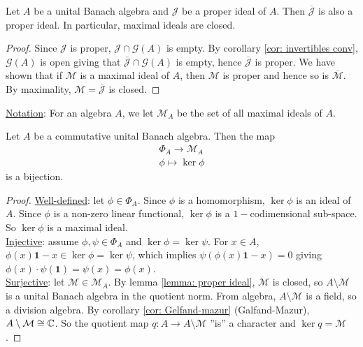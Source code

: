 \documentclass{article}
\begin{document}
\begin{boxlemma}\label{lemma: proper ideal}
    Let $A$ be a unital Banach algebra and $\mathcal{J}$ be a proper ideal of $A$. Then $\overline{\mathcal{J}}$ is also a proper ideal. In particular, maximal ideals are closed.
\end{boxlemma}

\begin{proof}
    Since $\mathcal{J}$ is proper, $\mathcal{J}\cap \mathcal{G}(A)$ is empty. By corollary \ref{cor: invertibles conv}, $\mathcal{G}(A)$ is open giving that $\overline{\mathcal{J}}\cap \mathcal{G}(A)$ is empty, hence $\overline{\mathcal{J}}$ is proper. We have shown that if $\mathcal{M}$ is a maximal ideal of $A$, then $\mathcal{M}$ is proper and hence so is $\overline{\mathcal{M}}$. By maximality, $\mathcal{M} = \overline{\mathcal{J}}$ is closed.
\end{proof}

\noindent\underline{Notation}: For an algebra $A$, we let $\mathcal{M}_A$ be the set of all maximal ideals of $A$.

\begin{theorem}\label{thm: maximal ideal bijection}
    Let $A$ be a commutative unital Banach algebra. Then the map 
    $$
    \begin{array}{cc}
        \Phi_A \to \mathcal{M}_A\\
        \phi \mapsto \ker\phi
    \end{array}
    $$
    is a bijection.
\end{theorem}

\begin{proof}
    \noindent\underline{Well-defined}: let $\phi\in \Phi_A$. Since $\phi$ is a homomorphism, $\ker \phi$ is an ideal of $A$. Since $\phi$ is a non-zero linear functional, $\ker\phi$ is a $1-$codimensional sub-space. So $\ker\phi$ is a maximal ideal.\\

    \noindent\underline{Injective}: assume $\phi, \psi \in \Phi_A$ and $\ker\phi=\ker \psi$. For $x\in A$, $\phi(x)\mathbf{1}-x\in \ker\phi =\ker\psi$, which implies $\psi(\phi(x)\mathbf{1}-x)=0$ giving $\phi(x)\cdot \psi(\mathbf{1})=\psi(x)=\phi(x)$.\\

    \noindent\underline{Surjective}: let $\mathcal{M}\in \mathcal{M}_A$. By lemma \ref{lemma: proper ideal}, $\mathcal{M}$ is closed, so $A\setminus\mathcal{M}$ is a unital Banach algebra in the quotient norm. From algebra, $A\setminus\mathcal{M}$ is a field, so a division algebra. By corollary \ref{cor: Gelfand-mazur} (Galfand-Mazur), $A\setminus\mathcal{M}\cong \mathbb{C}$. So the quotient map $q:A\to A\setminus\mathcal{M}$ ''is'' a character and $\ker q = \mathcal{M}$.
\end{proof}
\end{document}
